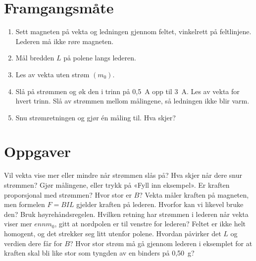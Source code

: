 \documentclass[11pt]{article}
\begin{document}
\section*{Framgangsmåte}

\begin{enumerate}
\item Sett magneten på vekta og ledningen gjennom feltet, vinkelrett på feltlinjene. Lederen må ikke røre magneten.
\item Mål bredden $L$ på polene langs lederen.
\item Les av vekta uten strøm $(m_{0})$.
\item Slå på strømmen og øk den i trinn på 0,5~A opp til 3~A. Les av vekta for hvert trinn. Slå av strømmen mellom målingene, så ledningen ikke blir varm.
\item Snu strømretningen og gjør én måling til. Hva skjer?
\end{enumerate}

\section*{Oppgaver}

\begin{oppgaveliste}
\oppgave {}Vil vekta vise mer eller mindre når strømmen slås på? Hva skjer når dere snur strømmen?
\svar
\oppgave {}Gjør målingene, eller trykk på «Fyll inn eksempel». Er kraften proporsjonal med strømmen? Hvor stor er $B$?
\svar
\oppgave {}Vekta måler kraften på magneten, men formelen $F = BIL$ gjelder kraften på lederen. Hvorfor kan vi likevel bruke den?
\svar
\oppgave {}Bruk høyrehåndsregelen. Hvilken retning har strømmen i lederen når vekta viser mer $enn m_{0}$, gitt at nordpolen er til venstre for lederen?
\svar
\oppgave {}Feltet er ikke helt homogent, og det strekker seg litt utenfor polene. Hvordan påvirker det $L$ og verdien dere får for $B$?
\svar
\oppgave {}Hvor stor strøm må gå gjennom lederen i eksemplet for at kraften skal bli like stor som tyngden av en binders på 0,50~g?
\svar
\end{oppgaveliste}
\end{document}
